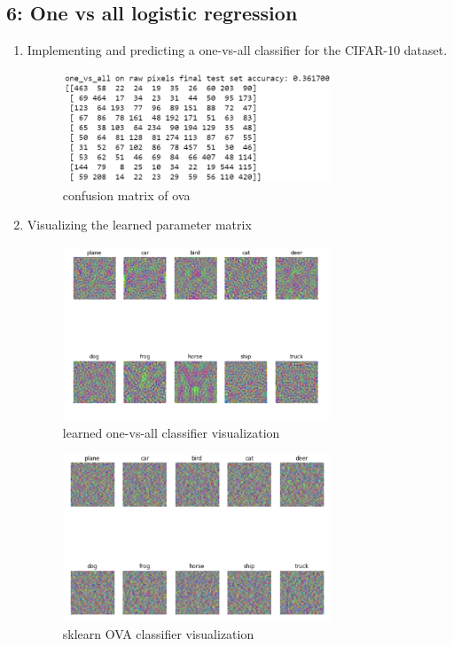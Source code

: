 \documentclass[]{book}
\theoremstyle{definition}
\begin{document}
\subsection*{6: One vs all logistic regression  }
\begin{enumerate}
	\item Implementing and predicting a one-vs-all classifier for the CIFAR-10 dataset.
	
	\begin{figure}[H]
		\centering
		\includegraphics[width=8cm]{ova.png}
		\caption{confusion matrix of ova}
		\label{fig:1}
	\end{figure}
	\item Visualizing the learned parameter matrix
	
	\begin{figure}[H]
		\centering
		\includegraphics[width=8cm]{ova_1.png}
		\caption{learned one-vs-all classifier visualization}
		\label{fig:2}
	\end{figure}
	\begin{figure}[H]
		\centering
		\includegraphics[width=8cm]{ova_2.png}
		\caption{sklearn OVA classifier visualization}
		\label{fig:3}
	\end{figure}
	
\end{enumerate}
\end{document}
